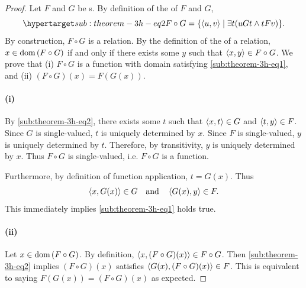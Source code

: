 \documentclass{report}
\begin{document}
  \begin{proof}
    Let $F$ and $G$ be s.
    By definition of the  of $F$ and $G$,
      \begin{equation}
        \hyperlabel{sub:theorem-3h-eq2}
        F \circ G = \{\tuple{u, v} \mid \exists t(uGt \land tFv)\}.
      \end{equation}
    By construction, $F \circ G$ is a relation.
    By the definition of the  of a relation,
      $x \in \mathop{\text{dom}}{(F \circ G)}$ if and only if there exists some $y$ such that
      $\left< x, y \right> \in F \circ G$.
    We prove that (i) $F \circ G$ is a function with domain satisfying
      \eqref{sub:theorem-3h-eq1}, and (ii) $(F \circ G)(x) = F(G(x))$.

    \paragraph{(i)}%

      By \eqref{sub:theorem-3h-eq2}, there exists some $t$ such that
        $\left< x, t \right> \in G$ and $\left< t, y \right> \in F$.
      Since $G$ is single-valued, $t$ is uniquely determined by $x$.
      Since $F$ is single-valued, $y$ is uniquely determined by $t$.
      Therefore, by transitivity, $y$ is uniquely determined by $x$.
      Thus $F \circ G$ is single-valued, i.e. $F \circ G$ is a function.

      Furthermore, by definition of function application, $t = G(x)$.
      Thus $$\left< x, G(x) \right> \in G \quad\text{and}\quad \left< G(x), y \right> \in F.$$
      This immediately implies \eqref{sub:theorem-3h-eq1} holds true.

    \paragraph{(ii)}%

      Let $x \in \mathop{\text{dom}}{(F \circ G)}$.
      By definition, $\left< x, (F \circ G)(x) \right> \in F \circ G$.
      Then \eqref{sub:theorem-3h-eq2} implies $(F \circ G)(x)$ satisfies
        $\left< G(x), (F \circ G)(x) \right> \in F$.
      This is equivalent to saying $F(G(x)) = (F \circ G)(x)$ as expected.

  \end{proof}

\subsection{}%
\end{document}
